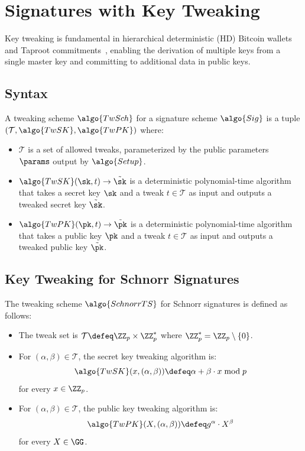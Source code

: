 \section{Signatures with Key Tweaking}\label{sec:signatures-key-tweaking}

Key tweaking is fundamental in hierarchical deterministic (HD) Bitcoin wallets~\cite{add:bip-hdwallets} and Taproot commitments~\cite{add:bip-taproot}, enabling the derivation of multiple keys from a single master key and committing to additional data in public keys.

\subsection{Syntax}

\begin{definition}
  A tweaking scheme $\algo{TwSch}$ for a signature scheme $\algo{Sig}$ is a tuple $(\mathcal{T}, \algo{TwSK}, \algo{TwPK})$ where:
  \begin{itemize}
    \item $\mathcal{T}$ is a set of allowed tweaks, parameterized by the public parameters $\params$ output by $\algo{Setup}$.
    \item $\algo{TwSK}(\sk, t) \rightarrow \tilde{\sk}$ is a deterministic polynomial-time algorithm that takes a secret key $\sk$ and a tweak $t \in \mathcal{T}$ as input and outputs a tweaked secret key $\tilde{\sk}$.
    \item $\algo{TwPK}(\pk, t) \rightarrow \tilde{\pk}$ is a deterministic polynomial-time algorithm that takes a public key $\pk$ and a tweak $t \in \mathcal{T}$ as input and outputs a tweaked public key $\tilde{\pk}$.
  \end{itemize}
\end{definition}

\subsection{Key Tweaking for Schnorr Signatures}

\begin{definition}[SchnorrTS]\label{def:schnorrts}
  The tweaking scheme $\algo{SchnorrTS}$ for Schnorr signatures is defined as follows:
  \begin{itemize}
    \item The tweak set is $\mathcal{T} \defeq \ZZ_p \times \ZZ_p^*$ where $\ZZ_p^* = \ZZ_p \setminus \{0\}$.
    \item For $(\alpha, \beta) \in \mathcal{T}$, the secret key tweaking algorithm is:
    \[
      \algo{TwSK}(x, (\alpha, \beta)) \defeq \alpha + \beta \cdot x \bmod p
    \]
    for every $x \in \ZZ_p$.
    \item For $(\alpha, \beta) \in \mathcal{T}$, the public key tweaking algorithm is:
    \[
      \algo{TwPK}(X, (\alpha, \beta)) \defeq g^\alpha \cdot X^\beta
    \]
    for every $X \in \GG$.
  \end{itemize}
\end{definition}

